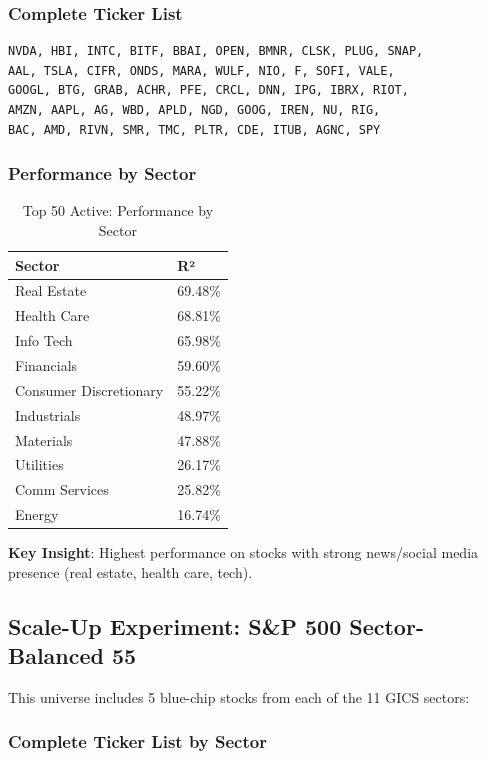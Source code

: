 \documentclass[12pt,a4paper]{article}
\begin{document}
\subsubsection{Complete Ticker List}

\begin{lstlisting}
NVDA, HBI, INTC, BITF, BBAI, OPEN, BMNR, CLSK, PLUG, SNAP,
AAL, TSLA, CIFR, ONDS, MARA, WULF, NIO, F, SOFI, VALE,
GOOGL, BTG, GRAB, ACHR, PFE, CRCL, DNN, IPG, IBRX, RIOT,
AMZN, AAPL, AG, WBD, APLD, NGD, GOOG, IREN, NU, RIG,
BAC, AMD, RIVN, SMR, TMC, PLTR, CDE, ITUB, AGNC, SPY
\end{lstlisting}

\subsubsection{Performance by Sector}

\begin{table}[H]
\centering
\begin{tabular}{ll}
\toprule
\textbf{Sector} & \textbf{R²} \\
\midrule
Real Estate & 69.48\% \\
Health Care & 68.81\% \\
Info Tech & 65.98\% \\
Financials & 59.60\% \\
Consumer Discretionary & 55.22\% \\
Industrials & 48.97\% \\
Materials & 47.88\% \\
Utilities & 26.17\% \\
Comm Services & 25.82\% \\
Energy & 16.74\% \\
\bottomrule
\end{tabular}
\caption{Top 50 Active: Performance by Sector}
\label{tab:top50_sectors}
\end{table}

\textbf{Key Insight}: Highest performance on stocks with strong news/social media presence (real estate, health care, tech).

\subsection{Scale-Up Experiment: S\&P 500 Sector-Balanced 55}

This universe includes 5 blue-chip stocks from each of the 11 GICS sectors:

\subsubsection{Complete Ticker List by Sector}
\end{document}
